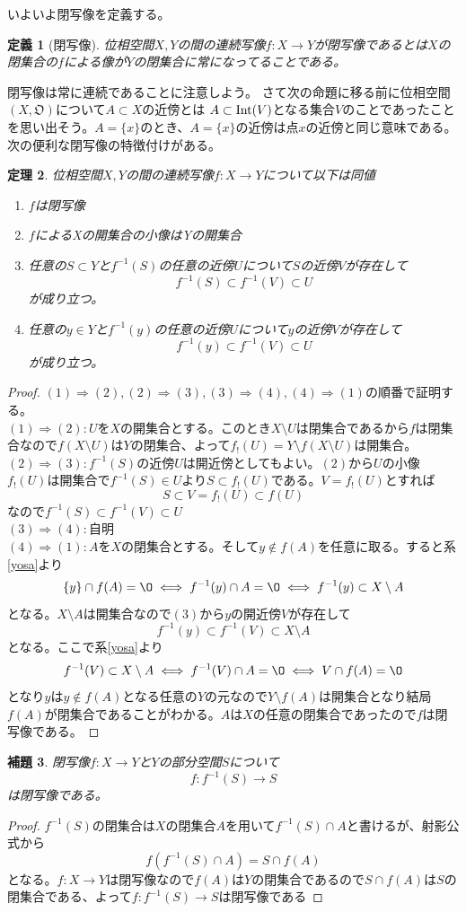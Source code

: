 \documentclass[leqno]{jsarticle}
\newtheorem{thm}{定理}
\newtheorem{lem}[thm]{補題}
\newtheorem{df}[thm]{定義}
\newcommand{\To}{\Longrightarrow}
\newcommand{\nai}{\text{{\rm Int}}}
\begin{document}
いよいよ閉写像を定義する。
\begin{df}[閉写像] 位相空間$X,Y$の間の連続写像$f:X\to  Y$が閉写像であるとは$X$の閉集合の$f$による像が$Y$の閉集合に常になってることである。
\end{df}
閉写像は常に連続であることに注意しよう。
さて次の命題に移る前に位相空間$(X,\mathfrak{O})$について$A\subset X$の近傍とは
$A\subset \nai (V)$となる集合$V$のことであったことを思い出そう。$A=\{x\}$のとき、$A=\{x\}$の近傍は点$x$の近傍と同じ意味である。\\ 
次の便利な閉写像の特徴付けがある。
\begin{thm}
位相空間$X,Y$の間の連続写像$f:X\to  Y$について以下は同値
\begin{enumerate}
\renewcommand{\labelenumi}{\rm{(\arabic{enumi})}}
\item$f$は閉写像 
\item $f$によるXの開集合の小像はYの開集合
\item 任意の$S\subset  Y$と$f^{-1}(S)$の任意の近傍$U$について$S$の近傍$V$が存在して
\[
f^{-1}(S)\subset f^{-1}(V)\subset U
\]
が成り立つ。
\item 任意の$y\in Y$と$f^{-1}(y)$の任意の近傍$U$について$y$の近傍$V$が存在して
\[
f^{-1}(y)\subset f^{-1}(V)\subset U
\]
が成り立つ。
\end{enumerate}
\end{thm}
\begin{proof}
$(1)\To(2),(2)\To(3),(3)\To(4),(4)\To(1)$の順番で証明する。\\
$(1)\To(2):$$U$を$X$の開集合とする。このとき$X\setminus U$は閉集合であるから$f$は閉集合なので$f(X\setminus U)$は$Y$の閉集合、よって$f_!(U)=Y\setminus f(X\setminus U)$は開集合。\\ 
$(2)\To(3):$$f^{-1}(S)$の近傍$U$は開近傍としてもよい。$(2)$から$U$の小像$f_!(U)$は開集合で$f^{-1}(S)\in U$より$S\subset  f_!(U)$である。$V=f_!(U)$とすれば
\[
S\subset  V=f_!(U)\subset f(U)
\]
なので$f^{-1}(S)\subset f^{-1}(V)\subset U$\\ 
$(3)\To(4):$自明\\ 
$(4)\To(1):$$A$を$X$の閉集合とする。そして$y\not\in f(A)$を任意に取る。すると系\ref{yosa}より
\[
\{y\}\cap f(A)=\O\iff f^{-1}(y)\cap A=\O\iff f^{-1}(y)\subset X\setminus A
\]
となる。$X\setminus A$は開集合なので$(3)$から$y$の開近傍$V$が存在して
\[
f^{-1}(y)\subset f^{-1}(V)\subset X\setminus A
\]
となる。ここで系\ref{yosa}より
\[
f^{-1}(V)\subset X\setminus A\iff f^{-1}(V)\cap A=\O\iff V\cap f(A)=\O
\]
となり$y$は$y\not\in f(A)$となる任意の$Y$の元なので$Y\setminus f(A)$は開集合となり結局$f(A)$が閉集合であることがわかる。$A$は$X$の任意の閉集合であったので$f$は閉写像である。
\end{proof}
\begin{lem}\label{seigen}閉写像$f:X\to Y$と$Y$の部分空間$S$について
\[
f:f^{-1}(S)\to S
\]
は閉写像である。
\end{lem}
\begin{proof}
$f^{-1}(S)$の閉集合は$X$の閉集合$A$を用いて$f^{-1}(S)\cap A$と書けるが、射影公式から
\[
f(f^{-1}(S)\cap A)=S\cap f(A)
\]
となる。$f:X\to Y$は閉写像なので$f(A)$は$Y$の閉集合であるので$S\cap f(A)$は$S$の閉集合である、よって$f:f^{-1}(S)\to S$は閉写像である
\end{proof}
\end{document}
